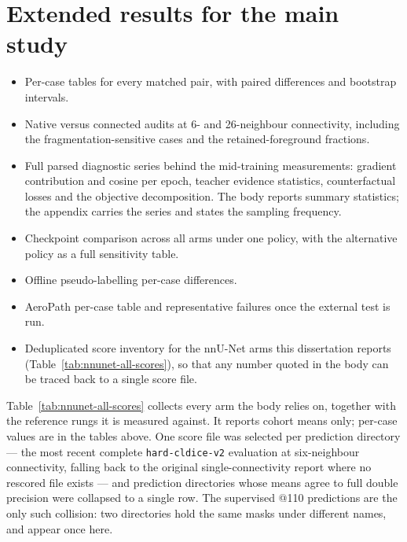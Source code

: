 \section{Extended results for the main study}

\begin{itemize}
  \item Per-case tables for every matched pair, with paired differences and bootstrap
  intervals.
  \item Native versus connected audits at 6- and 26-neighbour connectivity, including the
  fragmentation-sensitive cases and the retained-foreground fractions.
  \item Full parsed diagnostic series behind the mid-training measurements: gradient
  contribution and cosine per epoch, teacher evidence statistics, counterfactual losses and
  the objective decomposition. The body reports summary statistics; the appendix carries the
  series and states the sampling frequency.
  \item Checkpoint comparison across all arms under one policy, with the alternative policy as
  a full sensitivity table.
  \item Offline pseudo-labelling per-case differences.
  \item AeroPath per-case table and representative failures once the external test is run.
  \item Deduplicated score inventory for the nnU-Net arms this dissertation reports
  (Table~\ref{tab:nnunet-all-scores}), so that any number quoted in the body can be traced back
  to a single score file.
\end{itemize}

Table~\ref{tab:nnunet-all-scores} collects every arm the body relies on, together with the
reference rungs it is measured against. It reports cohort means only; per-case
values are in the tables above. One score file was selected per prediction directory --- the most
recent complete \texttt{hard-cldice-v2} evaluation at six-neighbour connectivity, falling back to
the original single-connectivity report where no rescored file exists --- and prediction
directories whose means agree to full double precision were collapsed to a single row. The
supervised @110 predictions are the only such collision: two directories hold the same masks under
different names, and appear once here.

